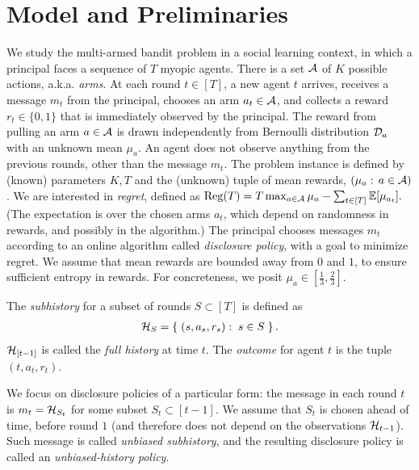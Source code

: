\section{Model and Preliminaries}
\label{sec:model}

We study the multi-armed bandit problem in a social learning context, in which a principal faces a sequence of $T$ myopic agents. There is a set $\mathcal{A}$ of $K$ possible actions, a.k.a. \emph{arms}. At each round $t\in [T]$, a new agent $t$ arrives, receives a message $m_t$ from the principal, chooses an arm $a_t\in \mathcal{A}$, and collects a reward $r_t\in \{0,1\}$ that is immediately observed by the principal. The reward from pulling an arm $a\in \mathcal{A}$ is drawn independently from Bernoulli distribution $\mathcal{D}_a$ with an unknown mean $\mu_a$. An agent does not observe anything from the previous rounds, other than the message $m_t$. The problem instance is defined by (known) parameters $K,T$ and the (unknown) tuple of mean rewards, $(\mu_a:\,a\in\mathcal{A})$. We are interested in \emph{regret}, defined as
 $ \mathrm{Reg}(T)
  = T \max_{a\in \mathcal{A}} \mu_a -
  \sum_{t\in [T]} \mathbb{E}[\mu_{a_t}].$
(The expectation is over the chosen arms $a_t$, which depend on randomness in rewards, and possibly in the algorithm.)
The principal chooses messages $m_t$ according to an online algorithm called \emph{disclosure policy}, with a goal to minimize regret. We assume that mean rewards are bounded away from $0$ and $1$, to ensure sufficient entropy in rewards. For concreteness, we posit
    $\mu_a\in [\tfrac13,\tfrac23]$.

The \emph{subhistory} for a subset of rounds $S\subset [T]$ is defined as
\begin{align} \label{eq:model-subhistory}
    \mathcal{H}_{S} = \left\{\; (s,a_s,r_s):\;s\in S \;\right\}.
\end{align}
$\mathcal{H}_{[t-1]}$ is called the \emph{full history} at time $t$.
The \emph{outcome} for agent $t$ is the tuple $(t,a_t,r_t)$.


We focus on disclosure policies of a particular form: the message in each round $t$ is $m_t = \mathcal{H}_{S_t}$ for some subset $S_t\subset [t-1]$. We assume that $S_t$ is chosen ahead of time, before round $1$ (and therefore does not depend on the observations $\mathcal{H}_{t-1}$). Such message is called \emph{unbiased subhistory}, and the resulting disclosure policy is called an \emph{unbiased-history policy}.

